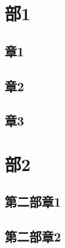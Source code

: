 \pagestyle{mystyle}

\part{部1}

\renewcommand{\parttitle}{部1名字}

\chapter{章1}


\chapter{章2}

\clearpage

\chapter{章3}

\storyend[第一部完]

\theendnotes

\part{部2}

\renewcommand{\parttitle}{部2名字}

\chapter{第二部章1}

\sampletext

\sampletext

\chapter{第二部章2}

\sampletext

\storyend

\theendnotes
